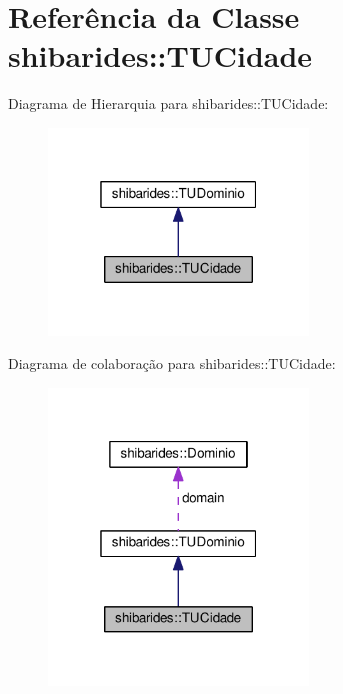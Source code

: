 \hypertarget{classshibarides_1_1TUCidade}{}\section{Referência da Classe shibarides\+:\+:T\+U\+Cidade}
\label{classshibarides_1_1TUCidade}


Diagrama de Hierarquia para shibarides\+:\+:T\+U\+Cidade\+:\nopagebreak
\begin{figure}[H]
\begin{center}
\leavevmode
\includegraphics[width=196pt]{classshibarides_1_1TUCidade__inherit__graph}
\end{center}
\end{figure}


Diagrama de colaboração para shibarides\+:\+:T\+U\+Cidade\+:\nopagebreak
\begin{figure}[H]
\begin{center}
\leavevmode
\includegraphics[width=196pt]{classshibarides_1_1TUCidade__coll__graph}
\end{center}
\end{figure}
